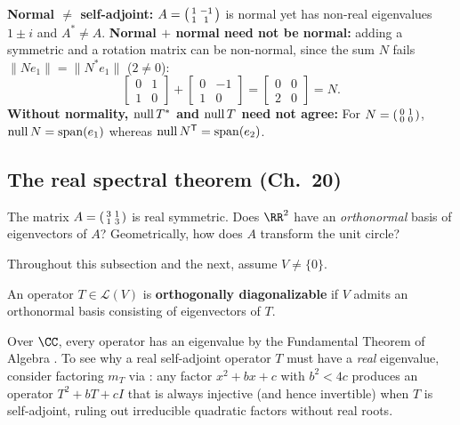\documentclass[10pt]{scrartcl}
\newcommand{\LL}{\mathcal L}\newcommand{\PP}{\mathcal P}\newcommand{\MM}{\mathcal M}
\begin{document}
\begin{trapbox}
  \ii \textbf{Normal $\neq$ self-adjoint:} $A=\begin{psmallmatrix}1&-1\\1&1\end{psmallmatrix}$ is normal yet has non-real eigenvalues $1\pm i$ and $A^*\neq A$.
  \ii \textbf{Normal $+$ normal need not be normal:} adding a symmetric and a rotation matrix can be non-normal, since the sum $N$ fails $\|Ne_1\|=\|N^*e_1\|$ ($2\neq0$):
  \[
    \begin{bmatrix}0&1\\1&0\end{bmatrix}+\begin{bmatrix}0&-1\\1&0\end{bmatrix}=\begin{bmatrix}0&0\\2&0\end{bmatrix} = N.
  \]
  \ii \textbf{Without normality, $\operatorname{null} T^*$ and $\operatorname{null} T$ need not agree:} For $N=\begin{psmallmatrix}0&1\\0&0\end{psmallmatrix}$, $\operatorname{null} N=\operatorname{span}(e_1)$ whereas $\operatorname{null} N^{\mathsf T}=\operatorname{span}(e_2)$.
\end{trapbox}

\subsection{The real spectral theorem (Ch.~20)}

\begin{qbox}
  The matrix $A=\begin{psmallmatrix}3&1\\1&3\end{psmallmatrix}$ is real symmetric. Does $\RR^2$ have an \emph{orthonormal} basis of eigenvectors of $A$? Geometrically, how does $A$ transform the unit circle?
\end{qbox}

Throughout this subsection and the next, assume $V\neq\{0\}$.

\begin{definition*}
  An operator $T\in\LL(V)$ is \textbf{orthogonally diagonalizable} if $V$ admits an orthonormal basis consisting of eigenvectors of $T$.
\end{definition*}

Over $\CC$, every operator has an eigenvalue by the Fundamental Theorem of Algebra . To see why a real self-adjoint operator $T$ must have a \emph{real} eigenvalue, consider factoring $m_T$ via : any factor $x^2+bx+c$ with $b^2<4c$ produces an operator $T^2+bT+cI$ that is always injective (and hence invertible) when $T$ is self-adjoint, ruling out irreducible quadratic factors without real roots.
\end{document}
